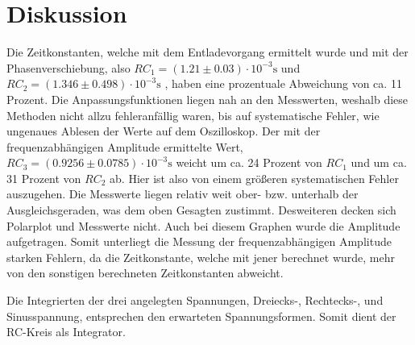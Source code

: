 \section{Diskussion}
\label{sec:Diskussion}


Die Zeitkonstanten, welche mit dem Entladevorgang ermittelt wurde und mit der Phasenverschiebung, also $RC_1 = (1.21 \pm 0.03)\cdot 10^{-3} \si{\second}$ 
und $RC_2 = (1.346 \pm 0.498) \cdot 10^{-3} \si{\second}$ , haben eine prozentuale Abweichung von ca. 11 Prozent. 
Die Anpassungsfunktionen liegen nah an den Messwerten, weshalb diese Methoden nicht allzu fehleranfällig waren, bis auf systematische Fehler,
wie ungenaues Ablesen der Werte auf dem Oszilloskop. Der mit der frequenzabhängigen Amplitude ermittelte Wert, $RC_3 = (0.9256\pm  0.0785)\cdot 10^{-3} \si{\second}$
weicht um ca. 24 Prozent von $RC_1$ und um ca. 31 Prozent von $RC_2$ ab. Hier ist also von einem größeren systematischen Fehler auszugehen.
Die Messwerte liegen relativ weit ober- bzw. unterhalb der Ausgleichsgeraden, was dem oben Gesagten zustimmt. 
Desweiteren decken sich Polarplot und Messwerte nicht. Auch bei diesem Graphen wurde die Amplitude aufgetragen. Somit unterliegt 
die Messung der frequenzabhängigen Amplitude starken Fehlern, da die Zeitkonstante, welche mit jener berechnet wurde, mehr von den
sonstigen berechneten Zeitkonstanten abweicht.

\noindent Die Integrierten der drei angelegten Spannungen, Dreiecks-, Rechtecks-, und Sinusspannung, entsprechen den erwarteten Spannungsformen.
Somit dient der RC-Kreis als Integrator.